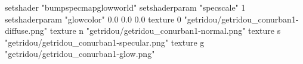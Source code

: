 setshader "bumpspecmapglowworld"
setshaderparam "specscale" 1
setshaderparam "glowcolor" 0.0 0.0 0.0
texture 0 "getridou/getridou_conurban1-diffuse.png"
texture n "getridou/getridou_conurban1-normal.png"
texture s "getridou/getridou_conurban1-specular.png"
texture g "getridou/getridou_conurban1-glow.png"